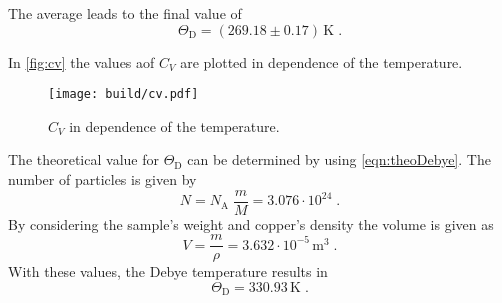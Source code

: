 The average leads to the final value of
\begin{equation*}
    \Theta _{\text{D}}= (269.18 \pm  0.17)\,\unit{\kelvin} \; .
\end{equation*}

In \autoref{fig:cv} the values aof $C_V$ are plotted in dependence of the temperature.
\begin{figure}
    \centering
        \texttt{[image: build/cv.pdf]}
        \caption{$C_V$ in dependence of the temperature.}
        \label{fig:cv}
\end{figure}



The theoretical value for $\Theta _{\text{D}}$ can be determined by using \autoref{eqn:theoDebye}.
The number of particles is given by 
\begin{equation*}
    N=N_{\text{A}}\; \frac{m}{M}=3.076 \cdot 10^{24}\; .
\end{equation*}
By considering the sample's weight and copper's density the volume is given as 
\begin{equation*}
    V=\frac{m}{\rho}=3.632 \cdot 10^{-5} \, \unit{\meter}^3\; .
\end{equation*}
With these values, the Debye temperature results in
\begin{equation*}  
    \Theta_{\text{D}}=330.93\, \unit{\kelvin}\; .
\end{equation*}